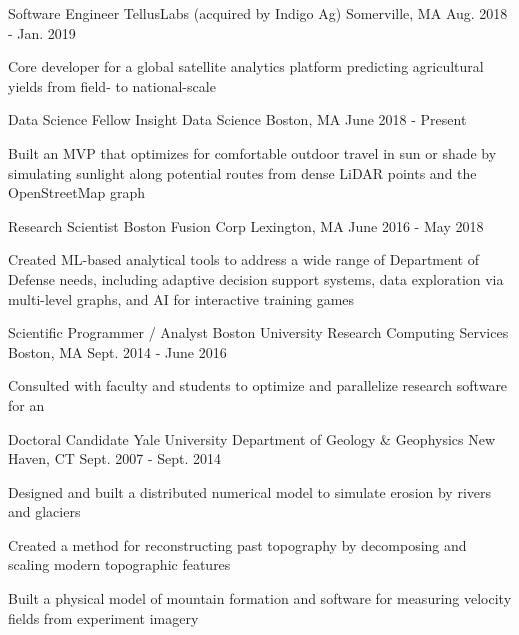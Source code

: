 \documentclass[11pt, a4paper]{awesome-cv}
\begin{document}
\begin{cventries}
  \cventrytight
    {Software Engineer}
    {TellusLabs (acquired by Indigo Ag)}
    {Somerville, MA}
    {Aug. 2018 - Jan. 2019}
    {
    \begin{cvitems}
      \item Core developer for a global satellite analytics platform predicting agricultural yields from field- to national-scale
    \end{cvitems}
    }


  \cventrytight
    {Data Science Fellow}
    {Insight Data Science}
    {Boston, MA}
    {June 2018 - Present}
    {
    \begin{cvitems}
      \item Built an MVP  that optimizes for comfortable outdoor travel in sun or shade by simulating sunlight along potential routes from dense LiDAR points and the OpenStreetMap graph
    \end{cvitems}
    }

  \cventrytight
    {Research Scientist}
    {Boston Fusion Corp}
    {Lexington, MA}
    {June 2016 - May 2018}
    {
      \begin{cvitems}
        \item Created ML-based analytical tools to address a wide range of Department of Defense needs, including adaptive decision support systems, data exploration via multi-level graphs, and AI for interactive training games
      \end{cvitems}
    }

  \cventrytight
    {Scientific Programmer / Analyst}
    {Boston University Research Computing Services}
    {Boston, MA}
    {Sept. 2014 - June 2016}
    {
      \begin{cvitems}
        \item {Consulted with faculty and students to optimize and parallelize research software for an } 
      \end{cvitems}
    }

  \cventrytight
    {Doctoral Candidate}
    {Yale University Department of Geology \& Geophysics}
    {New Haven, CT}
    {Sept. 2007 - Sept. 2014}
    {
      \begin{cvitems}
        \item {Designed and built a distributed numerical model to simulate erosion by rivers and glaciers}
        \item {Created a method for reconstructing past topography by decomposing and scaling modern topographic features}
        \item {Built a physical model of mountain formation and software for measuring velocity fields from experiment imagery}
      \end{cvitems} 
    }

\end{cventries}
\end{document}

